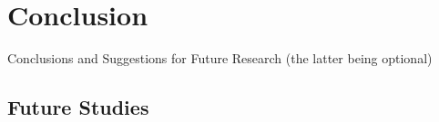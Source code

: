 \chapter*{Conclusion}
\label{ch:conclusion}


Conclusions and Suggestions for Future Research (the latter being optional)




\section{Future Studies}
\label{sec:future_study}